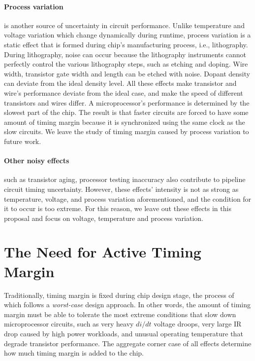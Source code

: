 \paragraph{Process variation} is another source of uncertainty in circuit performance. Unlike temperature and voltage variation which change dynamically during runtime, process variation is a static effect that is formed during chip's manufacturing process, i.e., lithography. During lithography, noise can occur because the lithography instruments cannot perfectly control the various lithography steps, such as etching and doping. Wire width, transistor gate width and length can be etched with noise. Dopant density can deviate from the ideal density level. All these effects make transistor and wire's performance deviate from the ideal case, and make the speed of different transistors and wires differ. A microprocessor's performance is determined by the slowest part of the chip. The result is that faster circuits are forced to have some amount of timing margin because it is synchronized using the same clock as the slow circuits. We leave the study of timing margin caused by process variation to future work.

\paragraph{Other noisy effects} such as transistor aging, processor testing inaccuracy also contribute to pipeline circuit timing uncertainty. However, these effects' intensity is not as strong as temperature, voltage, and process variation aforementioned, and the condition for it to occur is too extreme. For this reason, we leave out these effects in this proposal and focus on voltage, temperature and process variation.

\section{The Need for Active Timing Margin}
\label{sec:background:motivation}

Traditionally, timing margin is fixed during chip design stage, the process of which follows a \textit{worst-case} design approach. In other words, the amount of timing margin must be able to tolerate the most extreme conditions that slow down microprocessor circuits, such as very heavy $di/dt$ voltage droops, very large IR drop caused by high power workloads, and unusual operating temperature that degrade transistor performance. The aggregate corner case of all effects determine how much timing margin is added to the chip.

